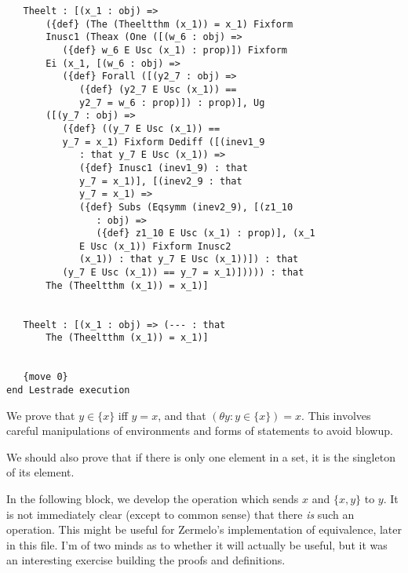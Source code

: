 \documentclass[12pt]{article}
\begin{document}
\begin{verbatim}
   Theelt : [(x_1 : obj) => 
       ({def} (The (Theeltthm (x_1)) = x_1) Fixform 
       Inusc1 (Theax (One ([(w_6 : obj) => 
          ({def} w_6 E Usc (x_1) : prop)]) Fixform 
       Ei (x_1, [(w_6 : obj) => 
          ({def} Forall ([(y2_7 : obj) => 
             ({def} (y2_7 E Usc (x_1)) == 
             y2_7 = w_6 : prop)]) : prop)], Ug 
       ([(y_7 : obj) => 
          ({def} ((y_7 E Usc (x_1)) == 
          y_7 = x_1) Fixform Dediff ([(inev1_9 
             : that y_7 E Usc (x_1)) => 
             ({def} Inusc1 (inev1_9) : that 
             y_7 = x_1)], [(inev2_9 : that 
             y_7 = x_1) => 
             ({def} Subs (Eqsymm (inev2_9), [(z1_10 
                : obj) => 
                ({def} z1_10 E Usc (x_1) : prop)], (x_1 
             E Usc (x_1)) Fixform Inusc2 
             (x_1)) : that y_7 E Usc (x_1))]) : that 
          (y_7 E Usc (x_1)) == y_7 = x_1)])))) : that 
       The (Theeltthm (x_1)) = x_1)]


   Theelt : [(x_1 : obj) => (--- : that 
       The (Theeltthm (x_1)) = x_1)]


   {move 0}
end Lestrade execution
\end{verbatim}

We prove that $y \in \{x\}$ iff $y=x$, and that $(\theta y: y \in \{x\})=x$.  This involves careful manipulations of environments and forms of statements to avoid blowup.

We should also prove that if there is only one element in a set, it is the singleton of its element.

In the following block, we develop the operation which sends $x$ and $\{x,y\}$ to $y$.  It is not immediately clear (except to common sense) that there
{\em is\/} such an operation.  This might be useful for Zermelo's implementation of equivalence, later in this file.  I'm of two minds as to whether it will actually be useful, but it was an interesting exercise building the proofs and definitions.
\end{document}
